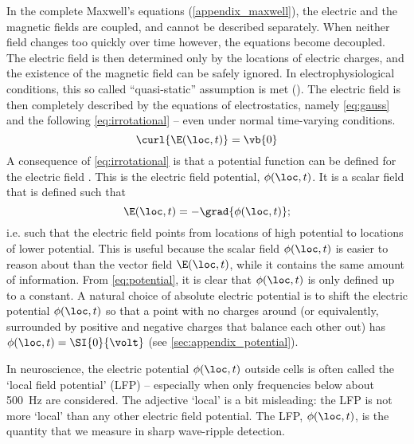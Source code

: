 In the complete Maxwell's equations (\cref{appendix_maxwell}), the electric and the magnetic fields are coupled, and cannot be described separately. When neither field changes too quickly over time however, the equations become decoupled. The electric field is then determined only by the locations of electric charges, and the existence of the magnetic field can be safely ignored. In electrophysiological conditions, this so called ``quasi-static'' assumption is met (\cite{Nunez2006,Plonsey2007}). The electric field is then completely described by the equations of electrostatics, namely \cref{eq:gauss} and the following \cref{eq:irrotational} -- even under normal time-varying conditions.
%
\begin{equation}
\label{eq:irrotational}
\curl{\E(\loc,t)} = \vb{0}
\end{equation}
%
A consequence of \cref{eq:irrotational} is that a potential function can be defined for the electric field \cite{Feynman2013}. This is the electric field potential, $\phi(\loc,t)$. It is a scalar field that is defined such that
%
\begin{equation}
\label{eq:potential}
\E(\loc,t) = -\grad{\phi(\loc,t)};
\end{equation}
%
i.e. such that the electric field points from locations of high potential to locations of lower potential. This is useful because the scalar field $\phi(\loc,t)$ is easier to reason about than the vector field $\E(\loc,t)$, while it contains the same amount of information. From \cref{eq:potential}, it is clear that $\phi(\loc,t)$ is only defined up to a constant. A natural choice of absolute electric potential is to shift the electric potential $\phi(\loc,t)$ so that a point with no charges around (or equivalently, surrounded by positive and negative charges that balance each other out) has $\phi(\loc,t) = \SI{0}{\volt}$ (see \cref{sec:appendix_potential}).

In neuroscience, the electric potential $\phi(\loc,t)$ outside cells is often called the `local field potential' (LFP) -- especially when only frequencies below about \SI{500}{\hertz} are considered.\footnotemark{} The adjective `local' is a bit misleading: the LFP is not more `local' than any other electric field potential. The LFP, $\phi(\loc,t)$, is the quantity that we measure in sharp wave-ripple detection.\label{def:LFP}


